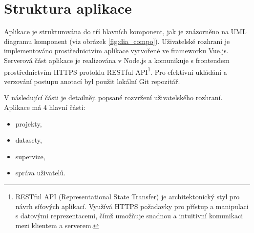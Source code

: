 \section{Struktura aplikace}
Aplikace je strukturována do tří hlavních komponent, jak je znázorněno na UML diagramu komponent (viz obrázek \ref{fig:dia_compo}). Uživatelské rozhraní je implementováno prostřednictvím aplikace vytvořené ve frameworku Vue.js. Serverová část aplikace je realizována v Node.js a komunikuje s frontendem prostřednictvím HTTPS protoklu RESTful API\footnote{RESTful API (Representational State Transfer) je architektonický styl pro návrh síťových aplikací. Využívá HTTPS požadavky pro přístup a manipulaci s datovými reprezentacemi, čímž umožňuje snadnou a intuitivní komunikaci mezi klientem a serverem.}. Pro efektivní ukládání a verzování postupu anotací byl použit lokální Git repozitář.


V následující části je detailněji popsané rozvržení uživatelského rozhraní. Aplikace má 4 hlavní části:

\begin{itemize}
    \item projekty,
    \item datasety,
    \item supervize,
    \item správa uživatelů.
\end{itemize}
